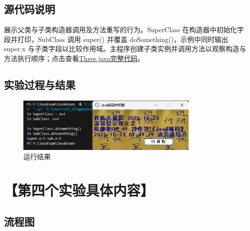 \documentclass[12pt,a4paper]{article}
\begin{document}
\subsection*{源代码说明}
展示父类与子类构造器调用及方法重写的行为。SuperClass 在构造器中初始化字段并打印，SubClass 调用 super() 并覆盖 doSomething()，示例中同时输出 super.x 与子类字段以比较作用域。主程序创建子类实例并调用方法以观察构造与方法执行顺序；点击查看\hyperref[sec:three]{Three.java完整代码}。

\subsection*{实验过程与结果}

\begin{figure}[H]
\centering
\includegraphics[width=0.8\textwidth]{threeb.png}
\caption{运行结果}
\end{figure}

\section*{【第四个实验具体内容】}
\subsection*{流程图}
\end{document}
